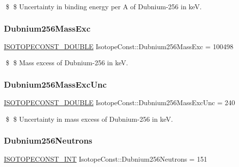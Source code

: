 \$ \$ Uncertainty in binding energy per A of Dubnium-\/256 in keV. \mbox{\label{group___isotope_const-_dubnium-_db256_ga3efe6b76057c66b08156d3a761924856}} 
\subsubsection{\texorpdfstring{Dubnium256\+Mass\+Exc}{Dubnium256MassExc}}
{\footnotesize\ttfamily \mbox{\hyperlink{group___isotope_const-_macros_ga8f45a7272ce02c0b4c65c44636ed719a}{I\+S\+O\+T\+O\+P\+E\+C\+O\+N\+S\+T\+\_\+\+D\+O\+U\+B\+LE}} Isotope\+Const\+::\+Dubnium256\+Mass\+Exc = 100498}

\$ \$ Mass excess of Dubnium-\/256 in keV. \mbox{\label{group___isotope_const-_dubnium-_db256_gaaad8c592dfdbeda3244222f296827ce9}} 
\subsubsection{\texorpdfstring{Dubnium256\+Mass\+Exc\+Unc}{Dubnium256MassExcUnc}}
{\footnotesize\ttfamily \mbox{\hyperlink{group___isotope_const-_macros_ga8f45a7272ce02c0b4c65c44636ed719a}{I\+S\+O\+T\+O\+P\+E\+C\+O\+N\+S\+T\+\_\+\+D\+O\+U\+B\+LE}} Isotope\+Const\+::\+Dubnium256\+Mass\+Exc\+Unc = 240}

\$ \$ Uncertainty in mass excess of Dubnium-\/256 in keV. \mbox{\label{group___isotope_const-_dubnium-_db256_ga18f151465e3867d292174c842c5c41d0}} 
\subsubsection{\texorpdfstring{Dubnium256\+Neutrons}{Dubnium256Neutrons}}
{\footnotesize\ttfamily \mbox{\hyperlink{group___isotope_const-_macros_ga5f18360b3e99483a35c32d789e62621c}{I\+S\+O\+T\+O\+P\+E\+C\+O\+N\+S\+T\+\_\+\+I\+NT}} Isotope\+Const\+::\+Dubnium256\+Neutrons = 151}

